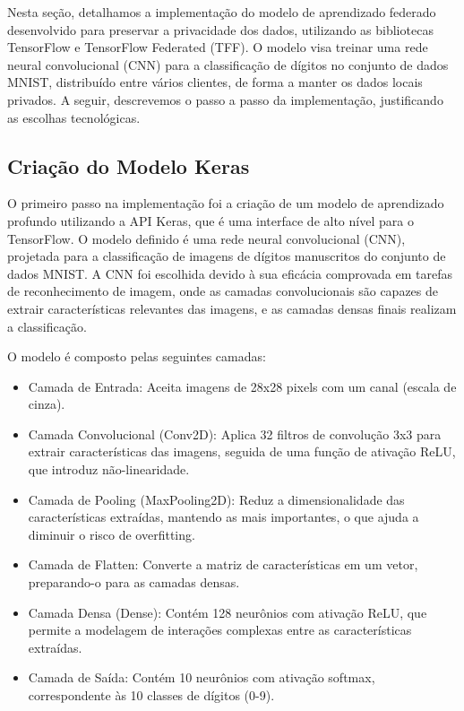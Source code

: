 Nesta seção, detalhamos a implementação do modelo de aprendizado federado desenvolvido para preservar a privacidade dos dados, utilizando as bibliotecas TensorFlow e TensorFlow Federated (TFF). O modelo visa treinar uma rede neural convolucional (CNN) para a classificação de dígitos no conjunto de dados MNIST, distribuído entre vários clientes, de forma a manter os dados locais privados. A seguir, descrevemos o passo a passo da implementação, justificando as escolhas tecnológicas.

\subsection{Criação do Modelo Keras}

O primeiro passo na implementação foi a criação de um modelo de aprendizado profundo utilizando a API Keras, que é uma interface de alto nível para o TensorFlow. O modelo definido é uma rede neural convolucional (CNN), projetada para a classificação de imagens de dígitos manuscritos do conjunto de dados MNIST. A CNN foi escolhida devido à sua eficácia comprovada em tarefas de reconhecimento de imagem, onde as camadas convolucionais são capazes de extrair características relevantes das imagens, e as camadas densas finais realizam a classificação.

O modelo é composto pelas seguintes camadas:

\begin{itemize}

    \item Camada de Entrada: Aceita imagens de 28x28 pixels com um canal (escala de cinza).
    \item Camada Convolucional (Conv2D): Aplica 32 filtros de convolução 3x3 para extrair características das imagens, seguida de uma função de ativação ReLU, que introduz não-linearidade.
    \item Camada de Pooling (MaxPooling2D): Reduz a dimensionalidade das características extraídas, mantendo as mais importantes, o que ajuda a diminuir o risco de overfitting.
    \item Camada de Flatten: Converte a matriz de características em um vetor, preparando-o para as camadas densas.
    \item Camada Densa (Dense): Contém 128 neurônios com ativação ReLU, que permite a modelagem de interações complexas entre as características extraídas.
    \item Camada de Saída: Contém 10 neurônios com ativação softmax, correspondente às 10 classes de dígitos (0-9).
\end{itemize}

